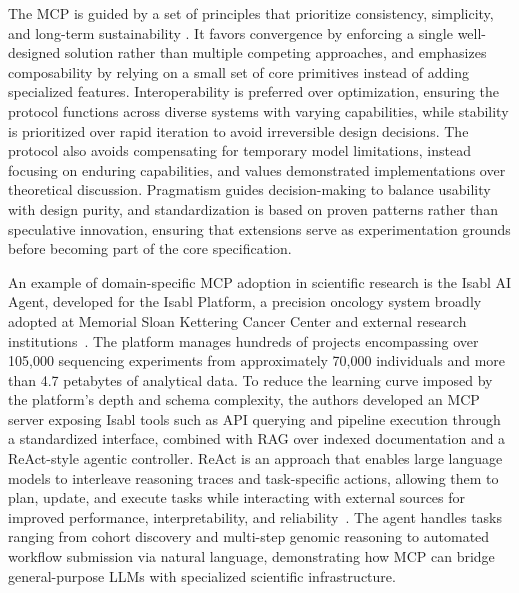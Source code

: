 \documentclass[
english,                 %
bibtex,                  %
includeExtraAbstracts, %
]{kththesis}
\numberwithin{listing}{chapter}
\begin{document}
The \gls{MCP} is guided by a set of principles that prioritize consistency, simplicity, and long-term sustainability \cite{delimarsky_mcp_2026, soria_parra_design_2026}. It favors convergence by enforcing a single well-designed solution rather than multiple competing approaches, and emphasizes composability by relying on a small set of core primitives instead of adding specialized features. Interoperability is preferred over optimization, ensuring the protocol functions across diverse systems with varying capabilities, while stability is prioritized over rapid iteration to avoid irreversible design decisions. The protocol also avoids compensating for temporary model limitations, instead focusing on enduring capabilities, and values demonstrated implementations over theoretical discussion. Pragmatism guides decision-making to balance usability with design purity, and standardization is based on proven patterns rather than speculative innovation, ensuring that extensions serve as experimentation grounds before becoming part of the core specification.

An example of domain-specific \gls{MCP} adoption in scientific research is the Isabl \gls{AI} Agent, developed for the Isabl Platform, a precision oncology system broadly adopted at Memorial Sloan Kettering Cancer Center and external research institutions~\cite{arango_ossa_abstract_2026}. The platform manages hundreds of projects encompassing over 105,000 sequencing experiments from approximately 70,000 individuals and more than 4.7 petabytes of analytical data. To reduce the learning curve imposed by the platform's depth and schema complexity, the authors developed an \gls{MCP} server exposing Isabl tools such as \gls{API} querying and pipeline execution through a standardized interface, combined with \gls{RAG} over indexed documentation and a ReAct-style agentic controller. ReAct is an approach that enables large language models to interleave reasoning traces and task-specific actions, allowing them to plan, update, and execute tasks while interacting with external sources for improved performance, interpretability, and reliability~\cite{yao_react_2022}. The agent handles tasks ranging from cohort discovery and multi-step genomic reasoning to automated workflow submission via natural language, demonstrating how \gls{MCP} can bridge general-purpose \glspl{LLM} with specialized scientific infrastructure.
\end{document}
